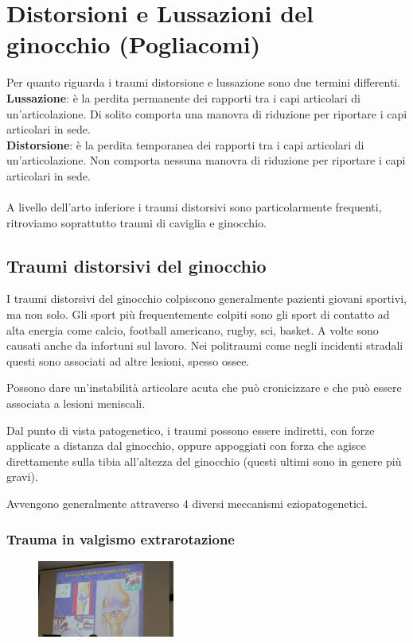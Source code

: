 \section{Distorsioni e Lussazioni del ginocchio (Pogliacomi)}

Per quanto riguarda i traumi distorsione e lussazione sono due termini differenti.
\textbf{Lussazione}: è la perdita permanente dei rapporti tra i capi articolari di un'articolazione. Di solito comporta una manovra di riduzione per riportare i capi articolari in sede.
\\
\textbf{Distorsione}: è la perdita temporanea dei rapporti tra i capi articolari di un'articolazione. Non comporta nessuna manovra di riduzione per riportare i capi articolari in sede.
\\\\
A livello dell'arto inferiore i traumi distorsivi sono particolarmente frequenti, ritroviamo soprattutto traumi di caviglia e ginocchio.

\subsection{Traumi distorsivi del ginocchio}

I traumi distorsivi del ginocchio colpiscono generalmente pazienti giovani sportivi, ma non solo. Gli sport più frequentemente colpiti sono gli sport di contatto ad alta energia come calcio, football americano, rugby, sci, basket. A volte sono causati anche da infortuni sul lavoro. Nei politraumi come negli incidenti stradali questi sono associati ad altre lesioni, spesso ossee.

Possono dare un'instabilità articolare acuta che può cronicizzare e che può essere associata a lesioni meniscali.

Dal punto di vista patogenetico, i traumi possono essere indiretti, con forze applicate a distanza dal ginocchio, oppure appoggiati con forza che agisce direttamente sulla tibia all'altezza del ginocchio (questi
ultimi sono in genere più gravi).

Avvengono generalmente attraverso 4 diversi meccanismi eziopatogenetici.

\subsubsection{Trauma in valgismo extrarotazione}

\begin{figure}[!ht]
\centering
\includegraphics[width=0.4\textwidth]{008/image5.jpeg}
\end{figure}


